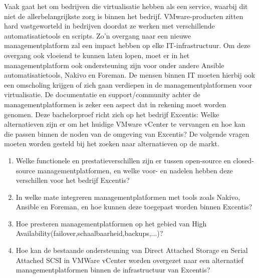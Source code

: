 Vaak gaat het om bedrijven die virtualisatie hebben als een service, waarbij dit niet de allerbelangrijkste zorg is binnen het bedrijf.
VMware-producten zitten hard vastgeworteld in bedrijven doordat ze werken met verschillende automatisatietools en scripts. Zo'n overgang naar een nieuwe managementplatform zal een impact hebben op elke IT-infrastructuur.
Om deze overgang ook vloeiend te kunnen laten lopen, moet er in het managementplatform ook ondersteuning zijn voor onder andere Ansible automatisatietools, Nakivo en Foreman.
De mensen binnen IT moeten hierbij ook een omscholing krijgen of zich gaan verdiepen in de managementplatformen  voor virtualisatie. De documentatie en support/community achter de managementplatformen is zeker een aspect dat in rekening moet worden genomen.
Deze bachelorproef richt zich op het bedrijf Excentis: Welke alternatieven zijn er om het huidige VMware vCenter te vervangen en hoe kan die passen binnen de noden van de omgeving van Excentis?
De volgende vragen moeten worden gesteld bij het zoeken naar alternatieven op de markt.
\begin{enumerate}
\item Welke functionele en prestatieverschillen zijn er tussen open-source en closed-source managementplatformen, en welke voor- en nadelen hebben deze verschillen voor het bedrijf Excentis?
\item In welke mate integreren managementplatformen met tools zoals Nakivo, Ansible en Foreman, en hoe kunnen deze toegepast worden binnen Excentis?
\item Hoe presteren managementplatformen op het gebied van High Availability(failover,\newline schaalbaarheid,backups,...)?
\item Hoe kan de bestaande ondersteuning van Direct Attached Storage en Serial Attached SCSI in VMWare vCenter worden overgezet naar een alternatief managementplatformen binnen de infrastructuur van Excentis?
\end{enumerate}





